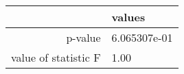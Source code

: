 \begin{tabular}{|r|l|}
  \hline
    & values \\
  \hline
  p-value & 6.065307e-01 \\
  \hline
  value of statistic F & 1.00 \\
  \hline
\end{tabular}
